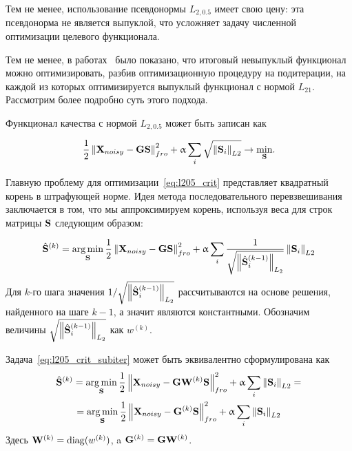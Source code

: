 Тем не менее, использование псевдонормы $L_{2, 0.5}$ имеет свою цену: эта псевдонорма
не является выпуклой, что усложняет задачу численной оптимизации целевого функционала.

Тем не менее, в работах~\cite{Candes2008, Gasso2009, Rakotomamonjy2011} было показано, что
итоговый невыпуклый функционал можно оптимизировать, разбив оптимизационную
процедуру на подитерации, на каждой из которых оптимизируется выпуклый
функционал с нормой $L_{21}$. Рассмотрим более подробно суть этого подхода.


Функционал качества с нормой $L_{2, 0.5}$ может быть записан как

\begin{equation}
    \frac{1}{2}\left\lVert\mathbf{X}_{noisy} - \mathbf{G}\mathbf{S}\right\rVert^2_{fro} + \upalpha \sum_i{\sqrt{\left\lVert\mathbf{S}_i\right\rVert_{L2}}}
    \rightarrow \underset{\mathbf{S}}{\min}.
    \label{eq:l205_crit}
\end{equation}

Главную проблему для оптимизации~\ref{eq:l205_crit} представляет квадратный
корень в штрафующей норме. Идея метода последовательного перевзвешивания
заключается в том, что мы аппроксимируем корень, используя веса для строк матрицы
$\mathbf{S}$ следующим образом:

\begin{equation}
    \hat{\mathbf{S}}^{(k)} = \operatorname*{arg\,min}_{\mathbf{S}} \frac{1}{2}\left\lVert\mathbf{X}_{noisy}
    - \mathbf{G}\mathbf{S}\right\rVert^2_{fro} + \upalpha
    \sum_i{\frac{1}{\sqrt{\left\lVert\hat{\mathbf{S}}_i^{(k-1)}\right\rVert_{L_2}}}\left\lVert\mathbf{S}_i\right\rVert_{L2}}
\label{eq:l205_crit_subiter}
\end{equation}
Для $k$-го шага значения $1/\sqrt{\left\lVert\hat{\mathbf{S}}_i^{(k-1)}\right\rVert_{L_2}}$ рассчитываются
на основе решения, найденного на шаге $k-1$, а значит являются константными. Обозначим
величины $\sqrt{\left\lVert\hat{\mathbf{S}}_i^{(k-1)}\right\rVert_{L_2}}$ как $w^{(k)}$.

Задача~\ref{eq:l205_crit_subiter} может быть эквивалентно сформулирована как
\begin{multline}
    \hat{\mathbf{S}}^{(k)} = \operatorname*{arg\,min}_{\mathbf{S}} \frac{1}{2}\left\lVert\mathbf{X}_{noisy}
    - \mathbf{G}\mathbf{W}^{(k)}\mathbf{S}\right\rVert^2_{fro} + \upalpha
    \sum_i{\left\lVert\mathbf{S}_i\right\rVert_{L2}} = \\
    = \operatorname*{arg\,min}_{\mathbf{S}} \frac{1}{2}\left\lVert\mathbf{X}_{noisy}
    - \mathbf{G}^{(k)}\mathbf{S}\right\rVert^2_{fro} + \upalpha
    \sum_i{\left\lVert\mathbf{S}_i\right\rVert_{L2}}
\label{eq:l205_crit_subiter_Wk}
\end{multline}
Здесь $\mathbf{W}^{(k)} = \operatorname{diag}(w^{(k)})$, a $\mathbf{G}^{(k)} = \mathbf{G} \mathbf{W}^{(k)}$.

